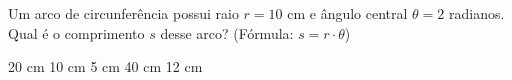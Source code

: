Um arco de circunferência possui raio $r = 10$ cm e ângulo central $\theta = 2$ radianos. Qual é o comprimento $s$ desse arco? (Fórmula: $s = r \cdot \theta$)

\parbox{\linewidth}{

20 cm
10 cm
5 cm
40 cm
12 cm

}


